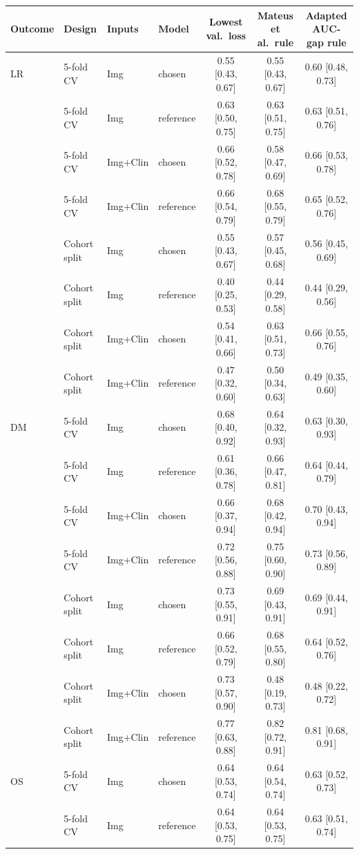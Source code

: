 \begin{tabular}{@{}llllccc@{}}
\toprule
Outcome & Design & Inputs & Model & Lowest val.\ loss & Mateus et al.\ rule & Adapted AUC-gap rule \\
\midrule
LR & 5-fold CV & Img & chosen & 0.55 [0.43, 0.67] & 0.55 [0.43, 0.67] & 0.60 [0.48, 0.73] \\
 & 5-fold CV & Img & reference & 0.63 [0.50, 0.75] & 0.63 [0.51, 0.75] & 0.63 [0.51, 0.76] \\
 & 5-fold CV & Img+Clin & chosen & 0.66 [0.52, 0.78] & 0.58 [0.47, 0.69] & 0.66 [0.53, 0.78] \\
 & 5-fold CV & Img+Clin & reference & 0.66 [0.54, 0.79] & 0.68 [0.55, 0.79] & 0.65 [0.52, 0.76] \\
 & Cohort split & Img & chosen & 0.55 [0.43, 0.67] & 0.57 [0.45, 0.68] & 0.56 [0.45, 0.69] \\
 & Cohort split & Img & reference & 0.40 [0.25, 0.53] & 0.44 [0.29, 0.58] & 0.44 [0.29, 0.56] \\
 & Cohort split & Img+Clin & chosen & 0.54 [0.41, 0.66] & 0.63 [0.51, 0.73] & 0.66 [0.55, 0.76] \\
 & Cohort split & Img+Clin & reference & 0.47 [0.32, 0.60] & 0.50 [0.34, 0.63] & 0.49 [0.35, 0.60] \\
\midrule
DM & 5-fold CV & Img & chosen & 0.68 [0.40, 0.92] & 0.64 [0.32, 0.93] & 0.63 [0.30, 0.93] \\
 & 5-fold CV & Img & reference & 0.61 [0.36, 0.78] & 0.66 [0.47, 0.81] & 0.64 [0.44, 0.79] \\
 & 5-fold CV & Img+Clin & chosen & 0.66 [0.37, 0.94] & 0.68 [0.42, 0.94] & 0.70 [0.43, 0.94] \\
 & 5-fold CV & Img+Clin & reference & 0.72 [0.56, 0.88] & 0.75 [0.60, 0.90] & 0.73 [0.56, 0.89] \\
 & Cohort split & Img & chosen & 0.73 [0.55, 0.91] & 0.69 [0.43, 0.91] & 0.69 [0.44, 0.91] \\
 & Cohort split & Img & reference & 0.66 [0.52, 0.79] & 0.68 [0.55, 0.80] & 0.64 [0.52, 0.76] \\
 & Cohort split & Img+Clin & chosen & 0.73 [0.57, 0.90] & 0.48 [0.19, 0.73] & 0.48 [0.22, 0.72] \\
 & Cohort split & Img+Clin & reference & 0.77 [0.63, 0.88] & 0.82 [0.72, 0.91] & 0.81 [0.68, 0.91] \\
\midrule
OS & 5-fold CV & Img & chosen & 0.64 [0.53, 0.74] & 0.64 [0.54, 0.74] & 0.63 [0.52, 0.73] \\
 & 5-fold CV & Img & reference & 0.64 [0.53, 0.75] & 0.64 [0.53, 0.75] & 0.63 [0.51, 0.74] \\

\end{tabular}
